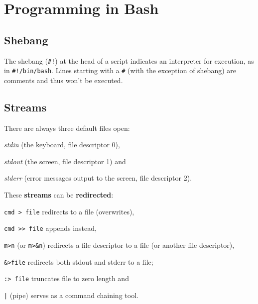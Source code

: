 \section{Programming in Bash}
\subsection{Shebang}
The shebang (\texttt{\#!}) at the head of a script indicates an 
interpreter for execution, as in \texttt{\#!/bin/bash}.
Lines starting with a \texttt{\#} (with the exception of shebang) 
are comments and thus won't be executed.

\subsection{Streams}
There are always three default files open:
\begin{enumx}
\item \emph{stdin} (the keyboard, file descriptor 0),
\item \emph{stdout} (the screen, file descriptor 1) and
\item \emph{stderr} (error messages output to the screen, file descriptor 2).
\end{enumx}

These \textbf{streams} can be \textbf{redirected}:
\begin{itemx} 
\item \texttt{cmd > file} redirects to a file (overwrites),
\item \texttt{cmd >{}> file} appends instead,
\item \texttt{m>n} (or \texttt{m>\&n}) redirects a file descriptor to a file 
(or another file descriptor), 
\item \texttt{\&>file} redirects both stdout and stderr to a file;
\item \texttt{:> file} truncates file to zero length and
\item \texttt{|} (pipe) serves as a command chaining tool.
\end{itemx}

